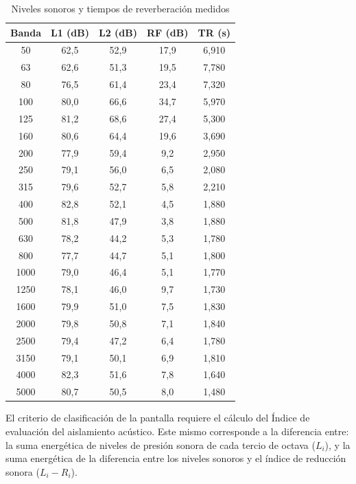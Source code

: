 \begin{table}[H]
\setlength\arrayrulewidth{1pt}
    \centering
    \begin{tabular}{|c|c|c|c|c|} \hline
        \textbf{Banda} & \textbf{L1 (dB)} & \textbf{L2 (dB)} & \textbf{RF (dB)} & \textbf{TR (s)} \\ \hline \hline
        50& 62,5&	52,9&	17,9&	6,910 \\ \hline
        63& 62,6&	51,3&	19,5&	7,780 \\ \hline
        80& 76,5&	61,4&	23,4&	7,320 \\ \hline
        100& 80,0&	66,6&	34,7&	5,970 \\ \hline
        125& 81,2&  68,6&	27,4&	5,300 \\ \hline
        160& 80,6&	64,4&	19,6&	3,690\\ \hline
        200& 77,9&	59,4&	9,2 &	2,950 \\ \hline
        250& 79,1&	56,0&	6,5 &	2,080\\ \hline
        315& 79,6&	52,7&	5,8 &	2,210 \\ \hline
        400& 82,8&	52,1&	4,5 &	1,880 \\ \hline
        500& 81,8&	47,9&	3,8 &	1,880 \\ \hline
        630& 78,2&	44,2&	5,3 &	1,780 \\ \hline
        800& 77,7&	44,7&	5,1 &	1,800 \\ \hline
        1000& 79,0&	46,4&	5,1 &	1,770 \\ \hline
        1250& 78,1&	46,0&	9,7 &	1,730 \\ \hline
        1600& 79,9&	51,0&	7,5 &	1,830 \\ \hline
        2000& 79,8&	50,8&	7,1 &	1,840 \\ \hline
        2500& 79,4&	47,2&	6,4 &	1,780 \\ \hline
        3150& 79,1&	50,1&	6,9 &	1,810 \\ \hline
        4000& 82,3&	51,6&	7,8 &	1,640 \\ \hline
        5000& 80,7&	50,5&	8,0 &	1,480\\ \hline
    \end{tabular}
    \caption{Niveles sonoros y tiempos de reverberación medidos}
    \label{tab:Niveles_sonoros_y_tiempos_de_reverberacion_medidos}
\end{table}

\par El criterio de clasificación de la pantalla requiere el cálculo del Índice de evaluación del aislamiento acústico. Este mismo corresponde a la diferencia entre: la suma energética de niveles de presión sonora de cada tercio de octava ($L_i$), y la suma energética de la diferencia entre los niveles sonoros y el índice de reducción sonora ($L_i - R_i$).

